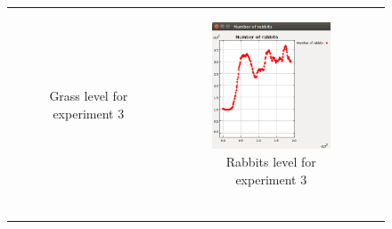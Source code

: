 \documentclass[11pt]{article}
\begin{document}
\begin{figure}
\begin{tabular}{c c c}
\begin{subfigure}[b]{0.3\textwidth}
        \caption{\label{img:grass3} Grass level for experiment 3}
    \end{subfigure} &
    \begin{subfigure}[b]{0.3\textwidth}
        \includegraphics[width=\textwidth]{experiment/4/Rabbits.png}
        \caption{\label{img:rabbits3} Rabbits level for experiment 3}
    \end{subfigure}\\
    \multicolumn{2}{c}{\begin{subfigure}[b]{0.3\textwidth}

\end{subfigure}}
\end{tabular}
\end{figure}
\end{document}

